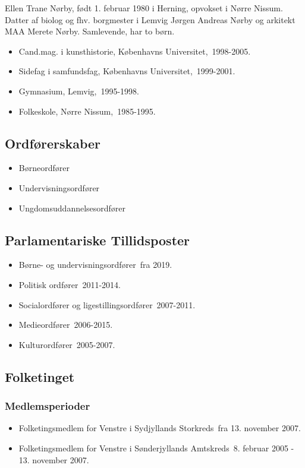 \documentclass[11pt, a4paper]{awesome-cv}
\begin{document}
\makecvheader[R]
\makelettertitle
\begin{cvletter}
Ellen Trane Nørby, født 1. februar 1980 i Herning, opvokset i Nørre Nissum. Datter af biolog og fhv. borgmester i Lemvig Jørgen Andreas Nørby og arkitekt MAA Merete Nørby. Samlevende, har to børn.

\begin{itemize}
\item Cand.mag. i kunsthistorie, Københavns Universitet, 1998-2005.
\item Sidefag i samfundsfag, Københavns Universitet, 1999-2001.
\item Gymnasium, Lemvig, 1995-1998.
\item Folkeskole, Nørre Nissum, 1985-1995.
\end{itemize}
\subsection*{Ordførerskaber}
\begin{itemize}
\item Børneordfører
\item Undervisningsordfører
\item Ungdomsuddannelsesordfører
\end{itemize}
\subsection*{Parlamentariske Tillidsposter}
\begin{itemize}
\item Børne- og undervisningsordfører fra 2019.
\item Politisk ordfører 2011-2014.
\item Socialordfører og ligestillingsordfører 2007-2011.
\item Medieordfører 2006-2015.
\item Kulturordfører 2005-2007.
\end{itemize}
\subsection*{Folketinget}
\subsubsection*{Medlemsperioder}
\begin{itemize}
\item Folketingsmedlem for Venstre i Sydjyllands Storkreds fra 13. november 2007.
\item Folketingsmedlem for Venstre i Sønderjyllands Amtskreds 8. februar 2005 - 13. november 2007.
\end{itemize}

\end{cvletter}
\end{document}
